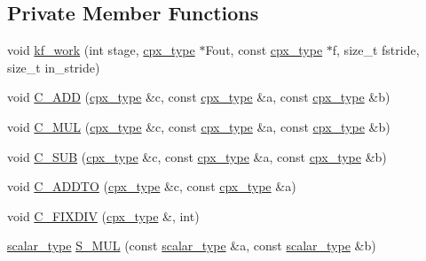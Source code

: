 \subsection*{Private Member Functions}
\begin{DoxyCompactItemize}
\item 
void \hyperlink{classkissfft_a33dc368507355e068428fb51bb42ba56}{kf\+\_\+work} (int stage, \hyperlink{classkissfft_af66664488b0b1b2995f3e4c2f63a8b7d}{cpx\+\_\+type} $\ast$Fout, const \hyperlink{classkissfft_af66664488b0b1b2995f3e4c2f63a8b7d}{cpx\+\_\+type} $\ast$f, size\+\_\+t fstride, size\+\_\+t in\+\_\+stride)
\item 
void \hyperlink{classkissfft_a4f053d9dbac7e4c7c8594b01eca50511}{C\+\_\+\+A\+DD} (\hyperlink{classkissfft_af66664488b0b1b2995f3e4c2f63a8b7d}{cpx\+\_\+type} \&c, const \hyperlink{classkissfft_af66664488b0b1b2995f3e4c2f63a8b7d}{cpx\+\_\+type} \&a, const \hyperlink{classkissfft_af66664488b0b1b2995f3e4c2f63a8b7d}{cpx\+\_\+type} \&b)
\item 
void \hyperlink{classkissfft_afa4efc3959abe6bb1e4c10f4442fed07}{C\+\_\+\+M\+UL} (\hyperlink{classkissfft_af66664488b0b1b2995f3e4c2f63a8b7d}{cpx\+\_\+type} \&c, const \hyperlink{classkissfft_af66664488b0b1b2995f3e4c2f63a8b7d}{cpx\+\_\+type} \&a, const \hyperlink{classkissfft_af66664488b0b1b2995f3e4c2f63a8b7d}{cpx\+\_\+type} \&b)
\item 
void \hyperlink{classkissfft_a1f4a4ec1b1ac1f2b199710b921b53a6d}{C\+\_\+\+S\+UB} (\hyperlink{classkissfft_af66664488b0b1b2995f3e4c2f63a8b7d}{cpx\+\_\+type} \&c, const \hyperlink{classkissfft_af66664488b0b1b2995f3e4c2f63a8b7d}{cpx\+\_\+type} \&a, const \hyperlink{classkissfft_af66664488b0b1b2995f3e4c2f63a8b7d}{cpx\+\_\+type} \&b)
\item 
void \hyperlink{classkissfft_a1cb327491bc3dce979631f5c2ebd142a}{C\+\_\+\+A\+D\+D\+TO} (\hyperlink{classkissfft_af66664488b0b1b2995f3e4c2f63a8b7d}{cpx\+\_\+type} \&c, const \hyperlink{classkissfft_af66664488b0b1b2995f3e4c2f63a8b7d}{cpx\+\_\+type} \&a)
\item 
void \hyperlink{classkissfft_aef8eb1d4326ae5c6a94ad71af0af87c5}{C\+\_\+\+F\+I\+X\+D\+IV} (\hyperlink{classkissfft_af66664488b0b1b2995f3e4c2f63a8b7d}{cpx\+\_\+type} \&, int)
\item 
\hyperlink{classkissfft_a074a5f74883901c625b6e80660d16ad4}{scalar\+\_\+type} \hyperlink{classkissfft_a118797ba0c80bcd14ed5792deeb22c58}{S\+\_\+\+M\+UL} (const \hyperlink{classkissfft_a074a5f74883901c625b6e80660d16ad4}{scalar\+\_\+type} \&a, const \hyperlink{classkissfft_a074a5f74883901c625b6e80660d16ad4}{scalar\+\_\+type} \&b)

\end{DoxyCompactItemize}
